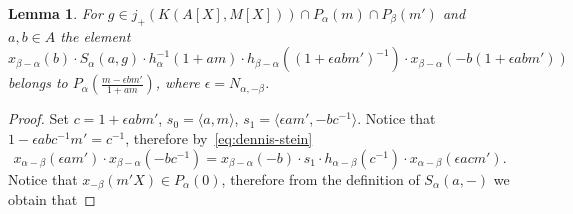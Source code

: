 \documentclass[oneside, 8pt]{amsart}
\newtheorem{lemma}{Lemma}
\theoremstyle{remark}
\theoremstyle{definition}
\numberwithin{lemma}{section}
\numberwithin{prop}{section}
\numberwithin{corollary}{section}
\numberwithin{externaltheorem}{section}
\numberwithin{equation}{section}
\begin{document}
\begin{lemma} \label{SR:obtuse} For $g \in j_+(K(A[X], M[X])) \cap P_\alpha(m) \cap P_\beta(m')$ and $a, b\in A$ the element \[ x_{\beta - \alpha}(b) \cdot S_\alpha(a, g) \cdot h_{\alpha}^{-1}(1+am)\cdot h_{\beta - \alpha}((1 + \epsilon abm')^{-1})\cdot x_{\beta - \alpha}(-b(1 + \epsilon abm')) \]
 belongs to $P_\alpha\left(\tfrac{m - \epsilon bm'}{1+am}\right)$, where $\epsilon = N_{\alpha, -\beta}$.
\end{lemma}
\begin{proof} Set $c = 1 + \epsilon a b m'$, $s_0 = \langle a, m \rangle$, $s_1 = \langle \epsilon am', -bc^{-1} \rangle$.
Notice that $1 - \epsilon abc^{-1}m' = c^{-1}$, therefore by~\eqref{eq:dennis-stein}
\begin{equation} \label{eq:computation-SR-obtuse} x_{\alpha-\beta}(\epsilon am') \cdot x_{\beta-\alpha}(-bc^{-1}) = x_{\beta-\alpha}(-b) \cdot s_1 \cdot h_{\alpha-\beta}(c^{-1}) \cdot x_{\alpha-\beta}(\epsilon acm').\end{equation}
Notice that $x_{-\beta}(m'X) \in P_\alpha(0)$, therefore from the definition of $S_\alpha(a, -)$ we obtain that
\newline {}
\end{proof}
\end{document}

